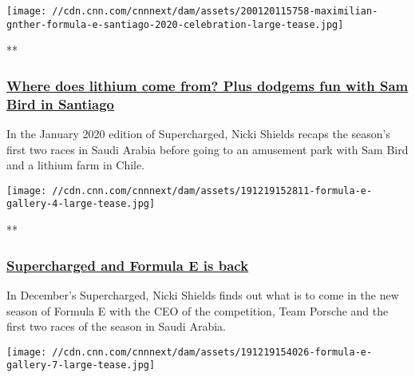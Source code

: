 \href{/videos/sports/2020/02/03/formula-e-returns-saudi-arabia-chile-sam-bird-lithium-farm-supercharged-jan-2020-vision-spt-intl.cnn}{}

\texttt{[image: //cdn.cnn.com/cnnnext/dam/assets/200120115758-maximilian-gnther-formula-e-santiago-2020-celebration-large-tease.jpg]}

**

\hypertarget{where-does-lithium-come-from-plus-dodgems-fun-with-sam-bird-in-santiago}{%
\subsubsection{\texorpdfstring{\href{/videos/sports/2020/02/03/formula-e-returns-saudi-arabia-chile-sam-bird-lithium-farm-supercharged-jan-2020-vision-spt-intl.cnn}{Where
does lithium come from? Plus dodgems fun with Sam Bird in
Santiago}}{Where does lithium come from? Plus dodgems fun with Sam Bird in Santiago}}\label{where-does-lithium-come-from-plus-dodgems-fun-with-sam-bird-in-santiago}}

In the January 2020 edition of Supercharged, Nicki Shields recaps the
season's first two races in Saudi Arabia before going to an amusement
park with Sam Bird and a lithium farm in Chile.

\href{/videos/sports/2020/01/03/formula-e-returns-2020-porsche-supercharged-december-vision-spt-intl.cnn}{}

\texttt{[image: //cdn.cnn.com/cnnnext/dam/assets/191219152811-formula-e-gallery-4-large-tease.jpg]}

**

\hypertarget{supercharged-and-formula-e-is-back}{%
\subsubsection{\texorpdfstring{\href{/videos/sports/2020/01/03/formula-e-returns-2020-porsche-supercharged-december-vision-spt-intl.cnn}{Supercharged
and Formula E is
back}}{Supercharged and Formula E is back}}\label{supercharged-and-formula-e-is-back}}

In December's Supercharged, Nicki Shields finds out what is to come in
the new season of Formula E with the CEO of the competition, Team
Porsche and the first two races of the season in Saudi Arabia.

\href{/videos/sports/2020/01/10/formula-e-explainer-season-2019-2020-vision-spt-intl.cnn}{}

\texttt{[image: //cdn.cnn.com/cnnnext/dam/assets/191219154026-formula-e-gallery-7-large-tease.jpg]}

